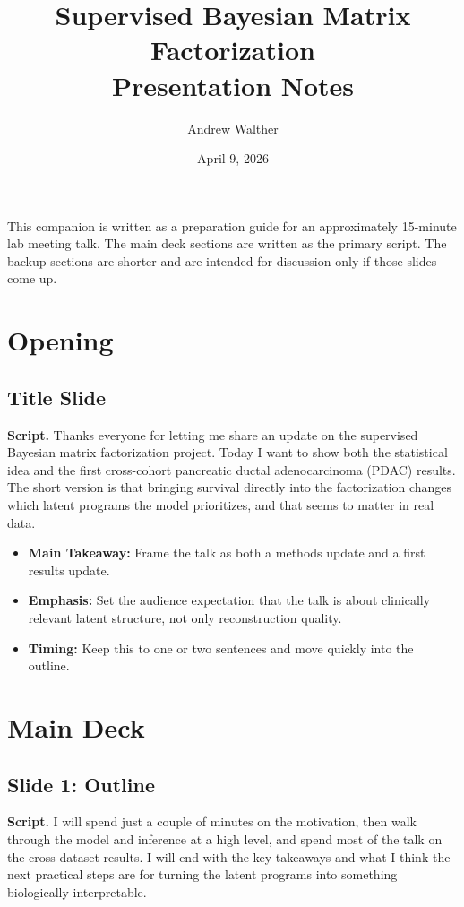 \documentclass[11pt]{article}
\title{Supervised Bayesian Matrix Factorization\\[0.8em]\large Presentation Notes}
\author{Andrew Walther}
\date{April 9, 2026}
\newcommand{\scriptlabel}{\textbf{Script. }}
\newcommand{\sectionlabel}[1]{\textbf{#1}}
\begin{document}
\maketitle

\noindent This companion is written as a preparation guide for an approximately 15-minute lab meeting talk. The main deck sections are written as the primary script. The backup sections are shorter and are intended for discussion only if those slides come up.

\section*{Opening}

\subsection*{Title Slide}
\scriptlabel Thanks everyone for letting me share an update on the supervised Bayesian matrix factorization project. Today I want to show both the statistical idea and the first cross-cohort pancreatic ductal adenocarcinoma (PDAC) results. The short version is that bringing survival directly into the factorization changes which latent programs the model prioritizes, and that seems to matter in real data.

\begin{itemize}
\item \sectionlabel{Main Takeaway:} Frame the talk as both a methods update and a first results update.
\item \sectionlabel{Emphasis:} Set the audience expectation that the talk is about clinically relevant latent structure, not only reconstruction quality.
\item \sectionlabel{Timing:} Keep this to one or two sentences and move quickly into the outline.
\end{itemize}

\section*{Main Deck}

\subsection*{Slide 1: Outline}
\scriptlabel I will spend just a couple of minutes on the motivation, then walk through the model and inference at a high level, and spend most of the talk on the cross-dataset results. I will end with the key takeaways and what I think the next practical steps are for turning the latent programs into something biologically interpretable.
\end{document}
